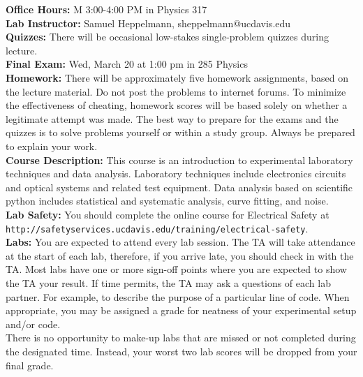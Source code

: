 \documentclass[12pt]{article}
\begin{document}
\noindent
\textbf{Office Hours:} M 3:00-4:00 PM in Physics 317 \\

\noindent
\textbf{Lab Instructor:} Samuel Heppelmann, sheppelmann@ucdavis.edu \\

\noindent
\textbf{Quizzes:}  There will be occasional low-stakes single-problem quizzes during lecture.\\

\noindent
\textbf{Final Exam:} Wed, March 20 at 1:00 pm in 285 Physics \\

\noindent
\textbf{Homework:} There will be approximately five homework
assignments, based on the lecture material.  Do not post the problems
to internet forums.  To minimize the effectiveness of cheating,
homework scores will be based solely on whether a legitimate attempt
was made.  The best way to prepare for the exams and the quizzes is to
solve problems yourself or within a study group.  Always be prepared
to explain your work.\\

\noindent
\textbf {Course Description:}  This course is an introduction to experimental laboratory techniques and data analysis.  Laboratory techniques include electronics circuits and optical systems and related test equipment.  Data analysis based on scientific python includes statistical and systematic analysis, curve fitting, and noise.\\

\noindent
\textbf {Lab Safety:} 
You should complete the online course for Electrical Safety at \\
{\tt http://safetyservices.ucdavis.edu/training/electrical-safety}.\\


\noindent
\textbf {Labs:} 
You are expected to attend every lab session.  The TA will take attendance at the start of each lab, therefore, if you arrive late, you should check in with the TA.   Most labs have one or more sign-off points where you are expected to show the TA your result.  If time permits, the TA may ask a questions of each lab partner.  For example, to describe the purpose of a particular line of code.  When appropriate, you may be assigned a grade for neatness of your experimental setup and/or code.\\

There is no opportunity to make-up labs that are missed or not completed during the designated time.  Instead, your worst two lab scores will be dropped from your final grade.  \\
\end{document}
